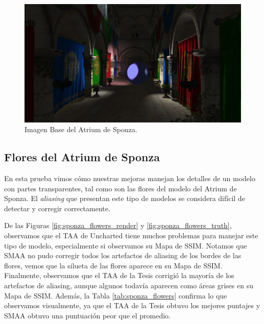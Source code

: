 \documentclass[pregrado]{tesis-usb} %
\begin{document}
\begin{figure}[!htb]
	\centering
	\includegraphics[scale=0.1]{images/results/sponza_sobel_ground_truth.png}
	\caption{Imagen Base del Atrium de Sponza.}\label{fig:sponza_truth}
\end{figure}

\FloatBarrier

\subsection{Flores del Atrium de Sponza}
En esta prueba vimos cómo nuestras mejoras manejan los detalles de un modelo con partes transparentes, tal como son las flores del modelo del Atrium de Sponza. El \textit{aliasing} que presentan este tipo de modelos se considera difícil de detectar y corregir correctamente. 

De las Figuras \ref{fig:sponza_flowers_render} y \ref{fig:sponza_flowers_truth}, observamos que el TAA de Uncharted tiene muchos problemas para manejar este tipo de modelo, especialmente si observamos su Mapa de SSIM. Notamos que SMAA no pudo corregir todos los artefactos de aliasing de los bordes de las flores, vemos que la silueta de las flores aparece en su Mapa de SSIM.  Finalmente, observamos que el TAA de la Tesis corrigió la mayoría de los artefactos de aliasing, aunque algunos todavía aparecen como áreas grises en su Mapa de SSIM. Además, la Tabla \ref{tab:sponza_flowers} confirma lo que observamos visualmente, ya que el TAA de la Tesis obtuvo los mejores puntajes y SMAA obtuvo una puntuación peor que el promedio.
\end{document}
